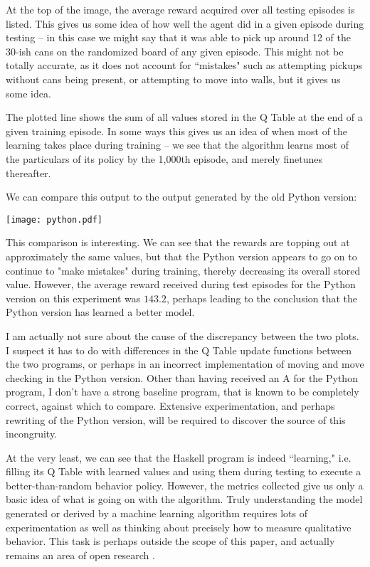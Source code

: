 \documentclass[12pt,a4paper]{article}
\begin{document}
		\par At the top of the image, the average reward acquired over all testing episodes is listed. This gives us some idea of how well the agent did in a given episode during testing -- in this case we might say that it was able to pick up around 12 of the 30-ish cans on the randomized board of any given episode. This might not be totally accurate, as it does not account for ``mistakes" such as attempting pickups without cans being present, or attempting to move into walls, but it gives us some idea.
		\par The plotted line shows the sum of all values stored in the Q Table at the end of a given training episode. In some ways this gives us an idea of when most of the learning takes place during training -- we see that the algorithm learns most of the particulars of its policy by the 1,000th episode, and merely finetunes thereafter.
		\par We can compare this output to the output generated by the old Python version:
		
		\texttt{[image: python.pdf]}
		
		\par This comparison is interesting. We can see that the rewards are topping out at approximately the same values, but that the Python version appears to go on to continue to "make mistakes" during training, thereby decreasing its overall stored value. However, the average reward received during test episodes for the Python version on this experiment was $143.2$, perhaps leading to the conclusion that the Python version has learned a better model. 
		\par I am actually not sure about the cause of the discrepancy between the two plots. I suspect it has to do with differences in the Q Table update functions between the two programs, or perhaps in an incorrect implementation of moving and move checking in the Python version. Other than having received an A for the Python program, I don't have a strong baseline program, that is known to be completely correct, against which to compare. Extensive experimentation, and perhaps rewriting of the Python version, will be required to discover the source of this incongruity.
		\par At the very least, we can see that the Haskell program is indeed ``learning," i.e. filling its Q Table with learned values and using them during testing to execute a better-than-random behavior policy. However, the metrics collected give us only a basic idea of what is going on with the algorithm. Truly understanding the model generated or derived by a machine learning algorithm requires lots of experimentation as well as thinking about precisely how to measure qualitative behavior. This task is perhaps outside the scope of this paper, and actually remains an area of open research \cite{nguyen}.
			
\end{document}
